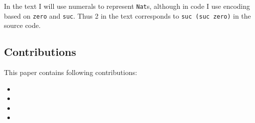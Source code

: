 In the text I will use numerals to represent \texttt{Nat}s, although in code I use encoding based on \texttt{zero} and \texttt{suc}. Thus 2 in the text corresponds to \texttt{suc (suc zero)} in the source code.

\subsection{Contributions}

This paper contains following contributions:

\begin{itemize}
 \item %
 \item %
 \item %
 \item %
\end{itemize}
